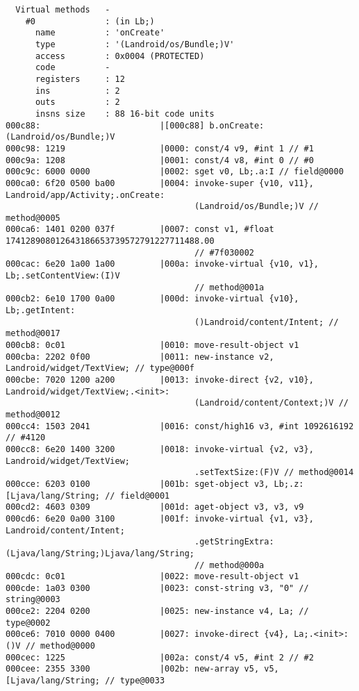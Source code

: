 \begin{lstlisting}
  Virtual methods   -
    #0              : (in Lb;)
      name          : 'onCreate'
      type          : '(Landroid/os/Bundle;)V'
      access        : 0x0004 (PROTECTED)
      code          -
      registers     : 12
      ins           : 2
      outs          : 2
      insns size    : 88 16-bit code units
000c88:                        |[000c88] b.onCreate:(Landroid/os/Bundle;)V
000c98: 1219                   |0000: const/4 v9, #int 1 // #1
000c9a: 1208                   |0001: const/4 v8, #int 0 // #0
000c9c: 6000 0000              |0002: sget v0, Lb;.a:I // field@0000
000ca0: 6f20 0500 ba00         |0004: invoke-super {v10, v11}, Landroid/app/Activity;.onCreate:
                                      (Landroid/os/Bundle;)V // method@0005
000ca6: 1401 0200 037f         |0007: const v1, #float 174128908012643186653739572791227711488.00
                                      // #7f030002
000cac: 6e20 1a00 1a00         |000a: invoke-virtual {v10, v1}, Lb;.setContentView:(I)V
                                      // method@001a
000cb2: 6e10 1700 0a00         |000d: invoke-virtual {v10}, Lb;.getIntent:
                                      ()Landroid/content/Intent; // method@0017
000cb8: 0c01                   |0010: move-result-object v1
000cba: 2202 0f00              |0011: new-instance v2, Landroid/widget/TextView; // type@000f
000cbe: 7020 1200 a200         |0013: invoke-direct {v2, v10}, Landroid/widget/TextView;.<init>:
                                      (Landroid/content/Context;)V // method@0012
000cc4: 1503 2041              |0016: const/high16 v3, #int 1092616192 // #4120
000cc8: 6e20 1400 3200         |0018: invoke-virtual {v2, v3}, Landroid/widget/TextView;
                                      .setTextSize:(F)V // method@0014
000cce: 6203 0100              |001b: sget-object v3, Lb;.z:[Ljava/lang/String; // field@0001
000cd2: 4603 0309              |001d: aget-object v3, v3, v9
000cd6: 6e20 0a00 3100         |001f: invoke-virtual {v1, v3}, Landroid/content/Intent;
                                      .getStringExtra:(Ljava/lang/String;)Ljava/lang/String;
                                      // method@000a
000cdc: 0c01                   |0022: move-result-object v1
000cde: 1a03 0300              |0023: const-string v3, "0" // string@0003
000ce2: 2204 0200              |0025: new-instance v4, La; // type@0002
000ce6: 7010 0000 0400         |0027: invoke-direct {v4}, La;.<init>:()V // method@0000
000cec: 1225                   |002a: const/4 v5, #int 2 // #2
000cee: 2355 3300              |002b: new-array v5, v5, [Ljava/lang/String; // type@0033

\end{lstlisting}
